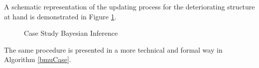A schematic representation of the updating process for the deteriorating structure at hand is demonstrated in Figure \ref{caseBayes}.

\vspace{0.5cm}

\begin{figure}[H]
    \centering
	\caption{Case Study Bayesian Inference}
	\label{caseBayes}
\end{figure}

\newpage
The same procedure is presented in a more technical and formal way in Algorithm \ref{bmuCase}.\\

